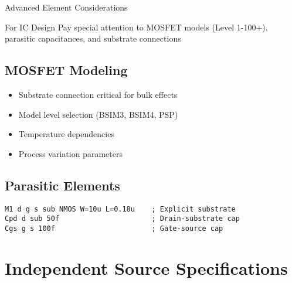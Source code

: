 \documentclass{beamer}
\begin{document}
\begin{frame}{Advanced Element Considerations}
    \begin{alertblock}{For IC Design}
        Pay special attention to MOSFET models (Level 1-100+), parasitic capacitances, and substrate connections
    \end{alertblock}
    
    \subsection{MOSFET Modeling}
    \begin{itemize}
        \item Substrate connection critical for bulk effects
        \item Model level selection (BSIM3, BSIM4, PSP)
        \item Temperature dependencies
        \item Process variation parameters
    \end{itemize}
    
    \subsection{Parasitic Elements}
    \begin{lstlisting}
M1 d g s sub NMOS W=10u L=0.18u    ; Explicit substrate
Cpd d sub 50f                      ; Drain-substrate cap
Cgs g s 100f                       ; Gate-source cap
    \end{lstlisting}
\end{frame}

\section{Independent Source Specifications}
\end{document}
